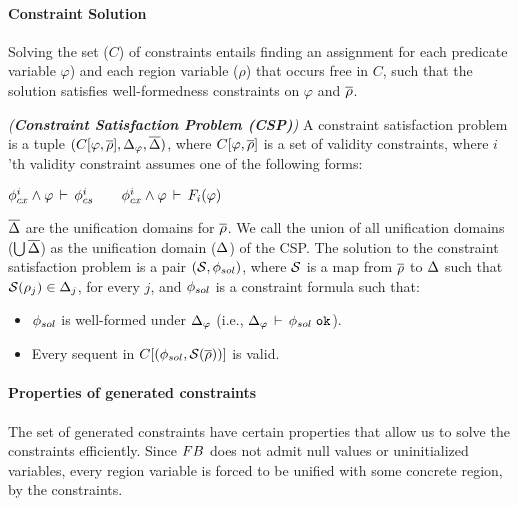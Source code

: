 \paragraph{Constraint Solution}
Solving the set ($C$) of constraints entails finding an
assignment for each predicate variable $\varphi$) and each region
variable ($\rho$) that occurs free in $C$, such that the solution
satisfies well-formedness constraints on $\varphi$ and $\overline{\rho}$.

\begin{definition}
\emph{(\textbf{Constraint Satisfaction Problem (CSP)})} A constraint
satisfaction problem is a tuple $(C\lbrack \varphi,\overline{\rho} \rbrack,\Delta_{\varphi}, \overline{\Delta})$, where $C\lbrack
\varphi,\overline{\rho} \rbrack$ is a set of validity constraints, where
$i$'th validity constraint assumes one of the following forms:
\begin{center}
\(
    \phi_{cx}^{i} \wedge \varphi\,\vdash\,\phi_{cs}^{i}\qquad
    \phi_{cx}^{i} \wedge \varphi\,\vdash\,F_i(\varphi)
\)
\end{center}
$\overline{\Delta}$ are the unification domains for $\overline{\rho}$. We call the
union of all unification domains ($\bigcup\overline{\Delta}$) as the
unification domain ($\Delta$) of the CSP.  The solution to the
constraint satisfaction problem is a pair $(\mathcal{S},\phi_{sol})$, where
$\mathcal{S}$ is a map from $\overline{\rho}$ to $\Delta$ such that
$\mathcal{S}(\rho_j) \in \Delta_j$, for every $j$, and $\phi_{sol}$ is a
constraint formula such that:
\begin{itemize}
\item $\phi_{sol}$ is well-formed under $\Delta_{\varphi}$ (i.e.,
$\Delta_{\varphi}\,\vdash\,\phi_{sol} \; \texttt{ok}$).
\item Every sequent in $C\lbrack (\phi_{sol},\mathcal{S}(\overline{\rho})) \rbrack$
is valid.
\end{itemize}
\end{definition}

\paragraph{Properties of generated constraints}
The set of generated constraints have certain properties that allow us to
solve the constraints efficiently.
%
Since ${\sc FB}$ does not admit null values or uninitialized variables, every region
variable is forced to be unified with some concrete region, by the constraints.


